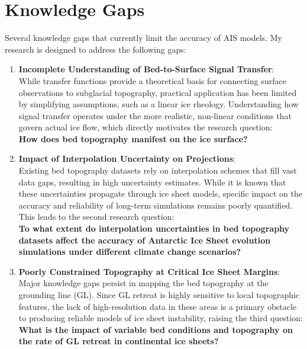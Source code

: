 \section{Knowledge Gaps}
Several knowledge gaps that currently limit the accuracy of AIS models. My research is designed to address the following gaps:
\begin{enumerate}
\item{\textbf{Incomplete Understanding of Bed-to-Surface Signal Transfer}}:\\While transfer functions provide a theoretical basis for connecting surface observations to subglacial topography, practical application has been limited by simplifying assumptions, such as a linear ice rheology. Understanding how signal transfer operates under the more realistic, non-linear conditions that govern actual ice flow, which directly motivates the research question:\\
\textbf{How does bed topography manifest on the ice surface?}

\item{\textbf{Impact of Interpolation Uncertainty on Projections}}:\\Existing bed topography datasets rely on interpolation schemes that fill vast data gaps, resulting in high uncertainty estimates. While it is known that these uncertainties propagate through ice sheet models, specific impact on the accuracy and reliability of long-term simulations remains poorly quantified. This leads to the second research question:\\
\textbf{To what extent do interpolation uncertainties in bed topography datasets affect the accuracy of Antarctic Ice Sheet evolution simulations under different climate change scenarios?}

\item{\textbf{Poorly Constrained Topography at Critical Ice Sheet Margins}}:\\Major knowledge gaps persist in mapping the bed topography at the grounding line (GL). Since GL retreat is highly sensitive to local topographic features, the lack of high-resolution data in these areas is a primary obstacle to producing reliable models of ice sheet instability, raising the third question:\\
\textbf{What is the impact of variable bed conditions and topography on the rate of GL retreat in continental ice sheets?}
\end{enumerate}